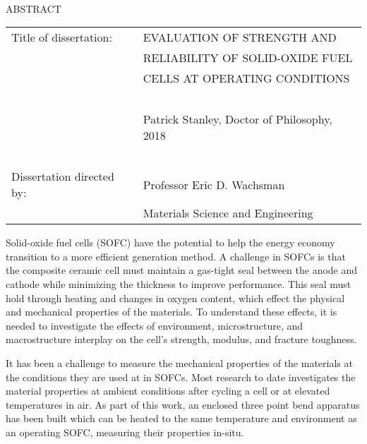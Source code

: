 

\hbox{\ }

\renewcommand{\baselinestretch}{1}
\small \normalsize

\begin{center}
\large{{ABSTRACT}}

\vspace{3em}

\end{center}
\hspace{-.15in}
\begin{tabular}{ll}
Title of dissertation:    & {\large  EVALUATION OF STRENGTH AND  }\\
&				      {\large  RELIABILITY OF SOLID-OXIDE FUEL } \\
&				      {\large  CELLS AT OPERATING CONDITIONS} \\
\ \\
&                          {\large  Patrick Stanley, Doctor of Philosophy, 2018} \\
\ \\
Dissertation directed by: & {\large  Professor Eric D. Wachsman} \\
&  				{\large	 Materials Science and Engineering } \\
\end{tabular}

\vspace{3em}

\renewcommand{\baselinestretch}{2}
\large \normalsize


Solid-oxide fuel cells (SOFC) have the potential to help the energy economy transition to a more efficient generation method.
A challenge in SOFCs is that the composite ceramic cell must maintain a gas-tight seal between the anode and cathode while minimizing the thickness to improve performance.
This seal must hold through heating and changes in oxygen content, which effect the physical and mechanical properties of the materials.
To understand these effects, it is needed to investigate the effects of environment, microstructure, and macrostructure interplay on the cell’s strength, modulus, and fracture toughness.

It has been a challenge to measure the mechanical properties of the materials at the conditions they are used at in SOFCs.
Most research to date investigates the material properties at ambient conditions after cycling a cell or at elevated temperatures in air.
As part of this work, an enclosed three point bend apparatus has been built which can be heated to the same temperature and environment as an operating SOFC, measuring their properties in-situ.

